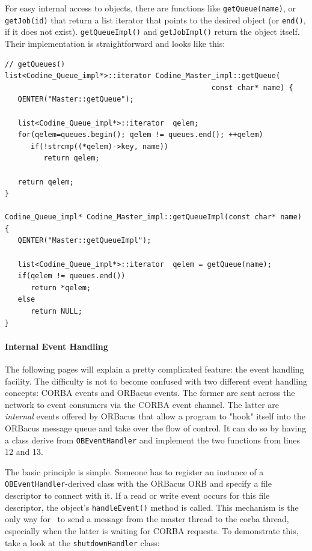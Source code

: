 For easy internal access to objects, there are functions like
\texttt{getQueue(name)}, or \texttt{getJob(id)} that return a list iterator
that points to the desired object (or \texttt{end()}, if it does not exist).
\texttt{getQueueImpl()} and \texttt{getJobImpl()} return the object itself.
Their implementation is straightforward and looks like this:

\begin{Verbatim}[fontsize=\small, frame=single]
// getQueues()
list<Codine_Queue_impl*>::iterator Codine_Master_impl::getQueue(
                                                const char* name) {         
   QENTER("Master::getQueue");

   list<Codine_Queue_impl*>::iterator  qelem;
   for(qelem=queues.begin(); qelem != queues.end(); ++qelem)
      if(!strcmp((*qelem)->key, name)) 
         return qelem;

   return qelem;
}

Codine_Queue_impl* Codine_Master_impl::getQueueImpl(const char* name) {
   QENTER("Master::getQueueImpl");

   list<Codine_Queue_impl*>::iterator  qelem = getQueue(name);
   if(qelem != queues.end())
      return *qelem;
   else
      return NULL;
}
\end{Verbatim}

\paragraph{Internal Event Handling}
The following pages will explain a pretty complicated feature: the
event handling facility. The difficulty is not to become confused with two
different event handling concepts: CORBA events and ORBacus events. The
former are sent across the network to event consumers via the CORBA event
channel. The latter are \emph{internal} events offered by ORB\-acus that allow
a program to "hook" itself into the ORBacus message queue and take over the
flow of control. It can do so by having a class derive from
\texttt{OBEventHandler} and implement the two functions from lines 12 and 13.

The basic principle is simple. Someone has to register an instance of a
\texttt{OBEventHandler}-derived class with the ORBacus ORB and specify a file
descriptor to connect with it. If a read or write event occurs for this file
descriptor, the object's \texttt{handleEvent()} method is called. This
mechanism is the only way for \qidl\ to send a message from the master thread
to the corba thread, especially when the latter is waiting for CORBA
requests. To demonstrate this, take a look at the \texttt{shutdownHandler}
class:

